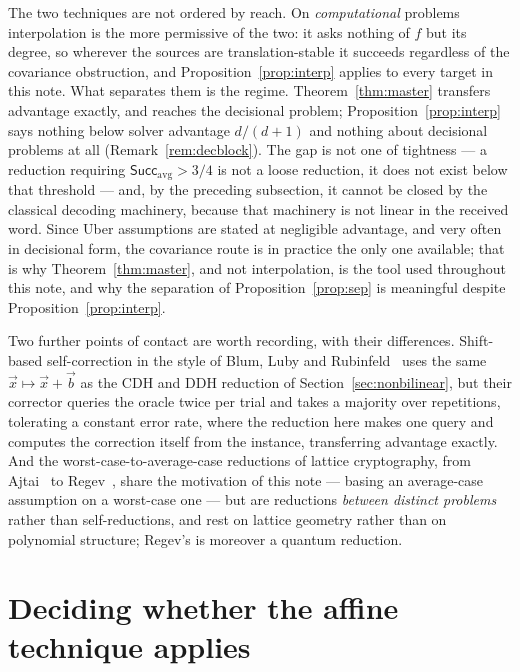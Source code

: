 \documentclass{conjura-solution}
\newcommand{\vx}{\vec{x}}
\newcommand{\vb}{\vec{b}}
\newcommand{\Succ}{\mathsf{Succ}}
\begin{document}
The two techniques are not ordered by reach. On \emph{computational} problems interpolation is
the more permissive of the two: it asks nothing of $f$ but its degree, so wherever the sources
are translation-stable it succeeds regardless of the covariance obstruction, and
Proposition~\ref{prop:interp} applies to every target in this note. What separates them is the
regime. Theorem~\ref{thm:master} transfers advantage exactly, and reaches the decisional
problem; Proposition~\ref{prop:interp} says nothing below solver advantage $d/(d+1)$ and
nothing about decisional problems at all (Remark~\ref{rem:decblock}). The gap is not one of
tightness --- a reduction
requiring $\Succ_{\mathrm{avg}}>3/4$ is not a loose reduction, it does not exist below that
threshold --- and, by the preceding subsection, it cannot be closed by the classical decoding
machinery, because that machinery is not linear in the received word. Since Uber assumptions
are stated at negligible advantage, and very often in decisional form, the covariance route is
in practice the only one available; that is why Theorem~\ref{thm:master}, and not
interpolation, is the tool used throughout this note, and why the separation of
Proposition~\ref{prop:sep} is meaningful despite Proposition~\ref{prop:interp}.

Two further points of contact are worth recording, with their differences. Shift-based
self-correction in the style of Blum, Luby and Rubinfeld~\cite{BLR93} uses the same
$\vx\mapsto\vx+\vb$ as the CDH and DDH reduction of Section~\ref{sec:nonbilinear}, but their
corrector queries the oracle twice per trial and takes a majority over repetitions, tolerating
a constant error rate, where the reduction here makes one query and computes the correction
itself from the instance, transferring advantage exactly. And the worst-case-to-average-case
reductions of lattice cryptography, from Ajtai~\cite{Ajtai96} to Regev~\cite{Regev09}, share
the motivation of this note --- basing an average-case assumption on a worst-case one --- but
are reductions \emph{between distinct problems} rather than self-reductions, and rest on
lattice geometry rather than on polynomial structure; Regev's is moreover a quantum reduction.

\section{Deciding whether the affine technique applies}
\label{sec:decide}
\end{document}
